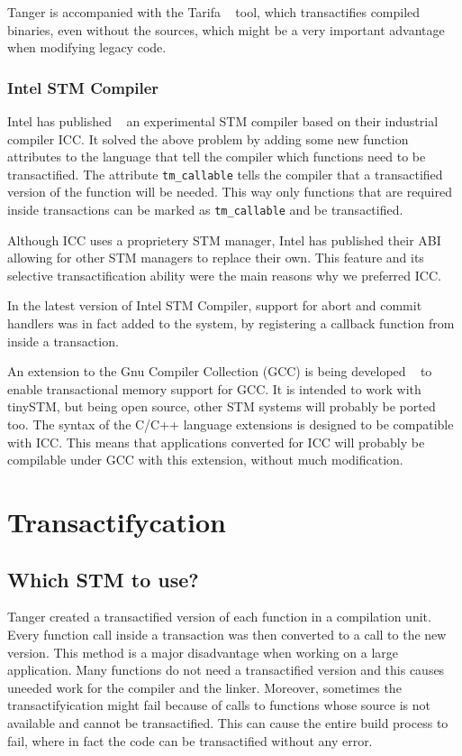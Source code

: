 \documentclass[preprint,natbib,11pt]{sigplanconf}
\begin{document}
{\sc Tanger} is accompanied with the {\sc Tarifa} ~\cite{felber2007tanger}
tool, which transactifies compiled binaries, even without the sources, which
might be a very important advantage when modifying legacy code.

\subsubsection{Intel STM Compiler}
Intel has published ~\cite{icc} an experimental STM compiler based on their industrial
compiler ICC. It solved the above problem by adding some new function attributes
to the language that tell the compiler which functions need to be transactified.
The attribute {\tt tm\_callable} tells the compiler that a transactified version
of the function will be needed. This way only functions that are required inside
transactions can be marked as {\tt tm\_callable} and be transactified.

Although ICC uses a proprietery STM manager, Intel has published their
ABI ~\cite{icc:abi} allowing for other STM managers to replace their own. This feature
and its selective transactification ability were the main reasons why we
preferred ICC.

In the latest version of Intel STM Compiler, support for abort and commit
handlers was in fact added to the system, by registering a callback function
from inside a transaction.

An extension to the Gnu Compiler Collection (GCC) is being developed ~\cite{gcctm} to
enable transactional memory support for GCC. It is intended to work with
tinySTM, but being open source, other STM systems will probably be ported too.
The syntax of the C/C++ language extensions is designed to be compatible with
ICC. This means that applications converted for ICC will probably be compilable
under GCC with this extension, without much modification.

\section{Transactifycation} 
\subsection{Which STM to use?}
{\sc Tanger} created a transactified version of each function in a compilation
unit.  Every function call inside a transaction was then converted to a call to
the new version. This method is a major disadvantage when working on a large
application. Many functions do not need a transactified version and this causes
uneeded work for the compiler and the linker. Moreover, sometimes the
transactifyication might fail because of calls to functions whose source is not
available and cannot be transactified. This can cause the entire build process
to fail, where in fact the code can be transactified without any error.
\end{document}
